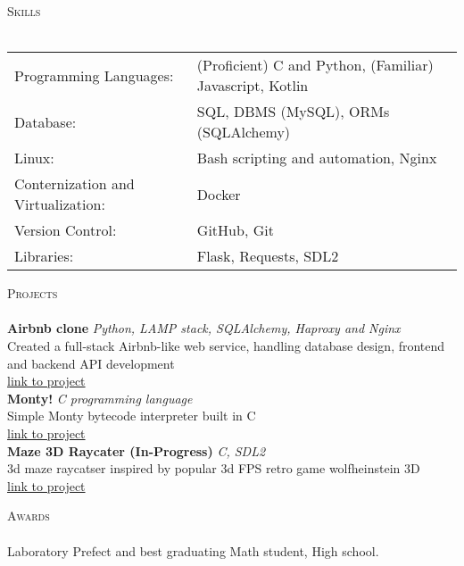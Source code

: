 \documentclass[a4paper]{article}
\newcommand{\lineunder} {
    \vspace*{-8pt} \\
    \hspace*{-18pt} \hrulefill \\
}
\newcommand{\header} [1] {
    {\hspace*{-18pt}\vspace*{6pt} \textsc{#1}}
    \vspace*{-6pt} \lineunder
}
\begin{document}
\header{Skills}
\begin{tabular}{ l l }
	Programming Languages:             & (Proficient) C and Python, (Familiar) Javascript, Kotlin \\
	Database:                          & SQL, DBMS (MySQL), ORMs (SQLAlchemy)                     \\
	Linux:                             & Bash scripting and automation, Nginx                     \\
	Conternization and Virtualization: & Docker                                                   \\
	Version Control:                   & GitHub, Git                                              \\
	Libraries:                         & Flask, Requests, SDL2                                    \\
\end{tabular}
\vspace{2mm}

\header{Projects}
{\textbf{Airbnb clone}} {\sl Python, LAMP stack, SQLAlchemy, Haproxy and Nginx} \\
Created a full-stack Airbnb-like web service, handling database design, frontend and backend API development\\
\href{https://github.com/felixhatesbugs/AirBnB_clone_v4}{link to project} \\
\vspace*{2mm}
{\textbf{Monty!}} {\sl C programming language} \\
Simple Monty bytecode interpreter built in C\\
\href{https://github.com/felixhatesbugs/monty}{link to project} \\
\vspace*{2mm}
{\textbf{Maze 3D Raycater (In-Progress)}} {\sl C, SDL2} \\
3d maze raycatser inspired by popular 3d FPS retro game wolfheinstein 3D\\
\href{https://github.com/felixhatesbugs/maze-raycasting-3D}{link to project} \\
\vspace*{2mm}

\header{Awards}
Laboratory Prefect and best graduating Math student, High school.\\
\vspace*{2mm}

\ 
\end{document}

